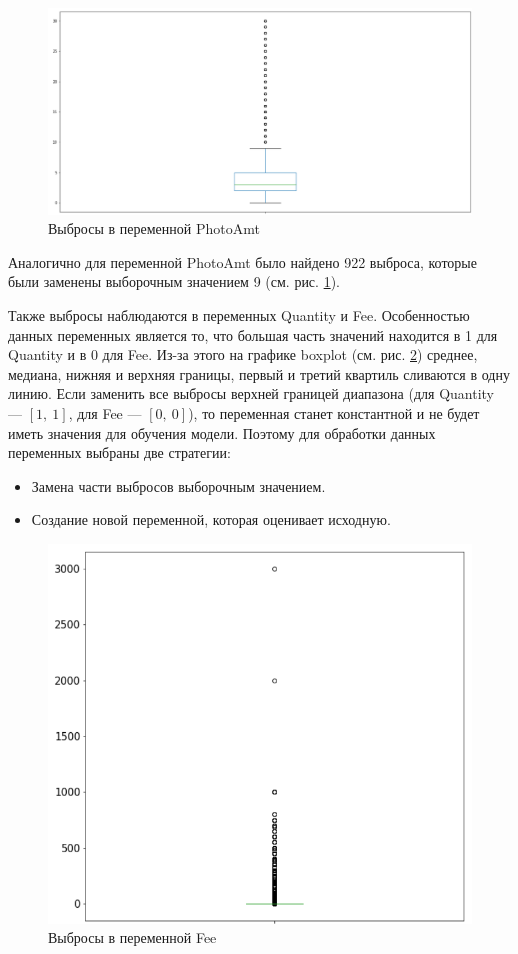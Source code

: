\documentclass[14pt]{mmcs_article}
\begin{document}
\begin{figure}[H]
	\centering
	\includegraphics[scale=0.7]{photooutlier.png}
	\caption{Выбросы в переменной PhotoAmt}\label{analyse:photooutlier}
\end{figure}

Аналогично для переменной PhotoAmt было найдено 922 выброса, которые были заменены выборочным значением 9 (см. рис. \ref{analyse:photooutlier}).

Также выбросы наблюдаются в переменных Quantity и Fee. Особенностью данных переменных является то, что большая часть значений находится в 1 для Quantity и в 0 для Fee. Из-за этого на графике boxplot (см. рис. \ref{analyse:feeoutlier}) среднее, медиана, нижняя и верхняя границы, первый и третий квартиль сливаются в одну линию. Если заменить все выбросы верхней границей диапазона (для Quantity --- $[1,\ 1]$, для Fee --- $[0,\ 0]$), то переменная станет константной и не будет иметь значения для обучения модели. Поэтому для обработки данных переменных выбраны две стратегии:
\begin{itemize}
	\item Замена части выбросов выборочным значением.
	\item Создание новой переменной, которая оценивает исходную.
\end{itemize}

\begin{figure}[H]
	\centering
	\includegraphics[scale=0.7]{feeoutlier.png}
	\caption{Выбросы в переменной Fee}\label{analyse:feeoutlier}
\end{figure}
\end{document}
